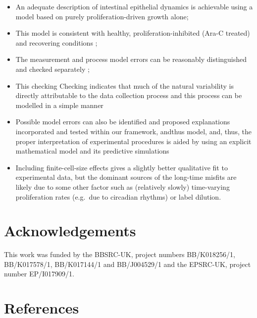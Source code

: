 \documentclass[10pt,letterpaper]{article}
\def\tightlist{}
\providecommand{\DIFaddtex}[1]{{\protect\color{blue} \sf #1}} %
\providecommand{\DIFdeltex}[1]{{\protect\color{red} \scriptsize #1}} %
\providecommand{\DIFaddbegin}{} %
\providecommand{\DIFaddend}{} %
\providecommand{\DIFdelbegin}{} %
\providecommand{\DIFdelend}{} %
\providecommand{\DIFadd}[1]{\texorpdfstring{\DIFaddtex{#1}}{#1}} %
\providecommand{\DIFdel}[1]{\texorpdfstring{\DIFdeltex{#1}}{}} %
\begin{document}
 \begin{itemize} 
\tightlist
\item
  An adequate description of intestinal epithelial dynamics is
  achievable using a model based on \DIFdelbegin \DIFdel{purely }\DIFdelend proliferation-driven growth \DIFaddbegin \DIFadd{alone;
}\DIFaddend \item
  This model is consistent with healthy, proliferation-inhibited (Ara-C
  treated) and recovering conditions\DIFaddbegin \DIFadd{;
}\DIFaddend \item
  The measurement and process model errors can be reasonably
  distinguished and checked separately\DIFaddbegin \DIFadd{;
}\DIFaddend \item
  \DIFdelbegin \DIFdel{This checking }\DIFdelend \DIFaddbegin \DIFadd{Checking }\DIFaddend indicates that much of the natural variability is
  \DIFdelbegin \DIFdel{directly }\DIFdelend attributable to the \DIFaddbegin \DIFadd{data }\DIFaddend collection process and this process can be
  modelled in a simple manner
\item
  Possible model errors can also be identified and proposed explanations
  incorporated and tested within our \DIFdelbegin \DIFdel{framework, andthus }\DIFdelend \DIFaddbegin \DIFadd{model, and, thus, }\DIFaddend the proper
  interpretation of experimental procedures is aided by using an
  explicit mathematical model and its predictive simulations
\item
  Including finite-cell-size effects gives a slightly better qualitative
  fit to experimental data, but the dominant sources of the long-time
  misfits are likely due to some other factor such as (relatively
  slowly) time-varying proliferation rates (e.g.~due to circadian
  rhythms) or label dilution.
 \end{itemize} 

\section{Acknowledgements}\label{acknowledgements}

This work was funded by the BBSRC-UK, project numbers BB/K018256/1,
BB/K017578/1, BB/K017144/1 and BB/J004529/1 and the EPSRC-UK, project
number EP/I017909/1.

\nolinenumbers

\section*{References}\label{references}
\end{document}

